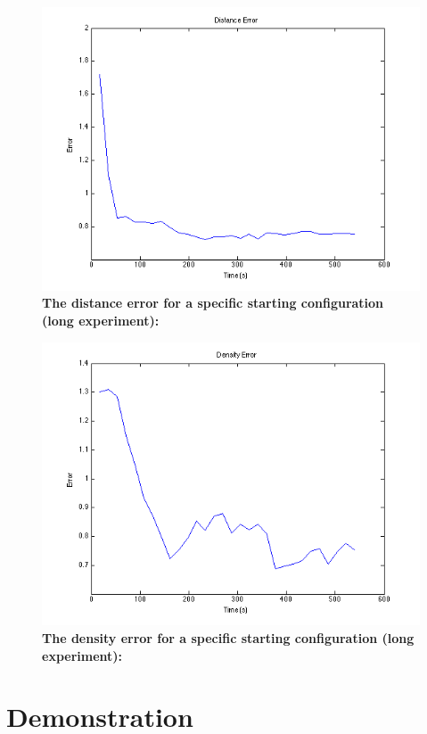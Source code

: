 \documentclass[oneside, a4paper, 12pt]{memoir}
\let\oldCaption\caption
\renewcommand{\caption}[2]{
\oldCaption[#1]{{\small\sffamily\bfseries #1:} #2}
}
\begin{document}
				\begin{figure}[!htp]
					\includegraphics[width=\textwidth]{../MATLAB/boxplot_geolong_distance.png}
					\caption{The distance error for a specific starting configuration (long experiment)}{}
				\end{figure}
			
				\begin{figure}[!htp]
					\includegraphics[width=\textwidth]{../MATLAB/boxplot_geolong_density.png}
					\caption{The density error for a specific starting configuration (long experiment)}{}
				\end{figure}
			
	\section{Demonstration}
	\label{sec:demonstration}
	
\end{document}
